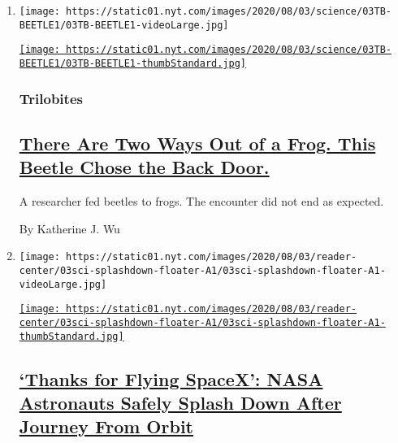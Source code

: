\begin{enumerate}
\def\labelenumi{\arabic{enumi}.}
\item
  \texttt{[image: https://static01.nyt.com/images/2020/08/03/science/03TB-BEETLE1/03TB-BEETLE1-videoLarge.jpg]}

  \href{/2020/08/03/science/beetle-frog-poop.html}{\texttt{[image: https://static01.nyt.com/images/2020/08/03/science/03TB-BEETLE1/03TB-BEETLE1-thumbStandard.jpg]}}

  \hypertarget{trilobites}{%
  \subsubsection{Trilobites}\label{trilobites}}

  \hypertarget{there-are-two-ways-out-of-a-frog-this-beetle-chose-the-back-door}{%
  \subsection{\texorpdfstring{\href{/2020/08/03/science/beetle-frog-poop.html}{There
  Are Two Ways Out of a Frog. This Beetle Chose the Back
  Door.}}{There Are Two Ways Out of a Frog. This Beetle Chose the Back Door.}}\label{there-are-two-ways-out-of-a-frog-this-beetle-chose-the-back-door}}

  A researcher fed beetles to frogs. The encounter did not end as
  expected.

  By Katherine J. Wu
\item
  \texttt{[image: https://static01.nyt.com/images/2020/08/03/reader-center/03sci-splashdown-floater-A1/03sci-splashdown-floater-A1-videoLarge.jpg]}

  \href{/2020/08/02/science/spacex-astronauts-splashdown.html}{\texttt{[image: https://static01.nyt.com/images/2020/08/03/reader-center/03sci-splashdown-floater-A1/03sci-splashdown-floater-A1-thumbStandard.jpg]}}

  \hypertarget{thanks-for-flying-spacex-nasa-astronauts-safely-splash-down-after-journey-from-orbit}{%
  \subsection{\texorpdfstring{\href{/2020/08/02/science/spacex-astronauts-splashdown.html}{`Thanks
  for Flying SpaceX': NASA Astronauts Safely Splash Down After Journey
  From
  Orbit}}{`Thanks for Flying SpaceX': NASA Astronauts Safely Splash Down After Journey From Orbit}}\label{thanks-for-flying-spacex-nasa-astronauts-safely-splash-down-after-journey-from-orbit}}


\end{enumerate}
